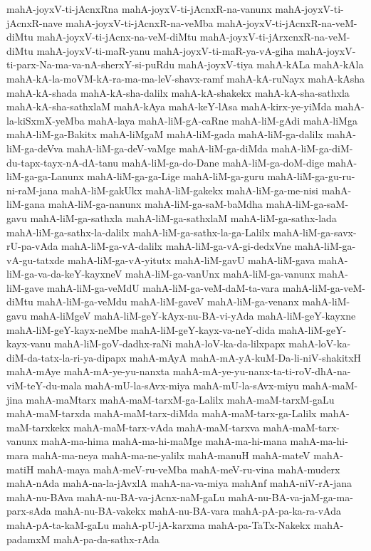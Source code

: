 {mahA-joyxV-ti-jAcnxRna
mahA-joyxV-ti-jAcnxR-na-vanunx
mahA-joyxV-ti-jAcnxR-nave
mahA-joyxV-ti-jAcnxR-na-veMba
mahA-joyxV-ti-jAcnxR-na-veM-diMtu
mahA-joyxV-ti-jAcnx-na-veM-diMtu
mahA-joyxV-ti-jArxcnxR-na-veM-diMtu
mahA-joyxV-ti-maR-yanu
mahA-joyxV-ti-maR-ya-vA-giha
mahA-joyxV-ti-parx-Na-ma-va-nA-sherxY-si-puRdu
mahA-joyxV-tiya
mahA-kALa
mahA-kAla
mahA-kA-la-moVM-kA-ra-ma-ma-leV-shavx-ramf
mahA-kA-ruNayx
mahA-kAsha
mahA-kA-shada
mahA-kA-sha-dalilx
mahA-kA-shakekx
mahA-kA-sha-sathxla
mahA-kA-sha-sathxlaM
mahA-kAya
mahA-keY-lAsa
mahA-kirx-ye-yiMda
mahA-la-kiSxmX-yeMba
mahA-laya
mahA-liM-gA-caRne
mahA-liM-gAdi
mahA-liMga
mahA-liM-ga-Bakitx
mahA-liMgaM
mahA-liM-gada
mahA-liM-ga-dalilx
mahA-liM-ga-deVva
mahA-liM-ga-deV-vaMge
mahA-liM-ga-diMda
mahA-liM-ga-diM-du-tapx-tayx-nA-dA-tanu
mahA-liM-ga-do-Dane
mahA-liM-ga-doM-dige
mahA-liM-ga-ga-Lanunx
mahA-liM-ga-ga-Lige
mahA-liM-ga-guru
mahA-liM-ga-gu-ru-ni-raM-jana
mahA-liM-gakUkx
mahA-liM-gakekx
mahA-liM-ga-me-nisi
mahA-liM-gana
mahA-liM-ga-nanunx
mahA-liM-ga-saM-baMdha
mahA-liM-ga-saM-gavu
mahA-liM-ga-sathxla
mahA-liM-ga-sathxlaM
mahA-liM-ga-sathx-lada
mahA-liM-ga-sathx-la-dalilx
mahA-liM-ga-sathx-la-ga-Lalilx
mahA-liM-ga-savx-rU-pa-vAda
mahA-liM-ga-vA-dalilx
mahA-liM-ga-vA-gi-dedxVne
mahA-liM-ga-vA-gu-tatxde
mahA-liM-ga-vA-yitutx
mahA-liM-gavU
mahA-liM-gava
mahA-liM-ga-va-da-keY-kayxneV
mahA-liM-ga-vanUnx
mahA-liM-ga-vanunx
mahA-liM-gave
mahA-liM-ga-veMdU
mahA-liM-ga-veM-daM-ta-vara
mahA-liM-ga-veM-diMtu
mahA-liM-ga-veMdu
mahA-liM-gaveV
mahA-liM-ga-venanx
mahA-liM-gavu
mahA-liMgeV
mahA-liM-geY-kAyx-nu-BA-vi-yAda
mahA-liM-geY-kayxne
mahA-liM-geY-kayx-neMbe
mahA-liM-geY-kayx-va-neY-dida
mahA-liM-geY-kayx-vanu
mahA-liM-goV-dadhx-raNi
mahA-loV-ka-da-lilxpapx
mahA-loV-ka-diM-da-tatx-la-ri-ya-dipapx
mahA-mAyA
mahA-mA-yA-kuM-Da-li-niV-shakitxH
mahA-mAye
mahA-mA-ye-yu-nanxta
mahA-mA-ye-yu-nanx-ta-ti-roV-dhA-na-viM-teY-du-mala
mahA-mU-la-sAvx-miya
mahA-mU-la-sAvx-miyu
mahA-maM-jina
mahA-maMtarx
mahA-maM-tarxM-ga-Lalilx
mahA-maM-tarxM-gaLu
mahA-maM-tarxda
mahA-maM-tarx-diMda
mahA-maM-tarx-ga-Lalilx
mahA-maM-tarxkekx
mahA-maM-tarx-vAda
mahA-maM-tarxva
mahA-maM-tarx-vanunx
mahA-ma-hima
mahA-ma-hi-maMge
mahA-ma-hi-mana
mahA-ma-hi-mara
mahA-ma-neya
mahA-ma-ne-yalilx
mahA-manuH
mahA-mateV
mahA-matiH
mahA-maya
mahA-meV-ru-veMba
mahA-meV-ru-vina
mahA-muderx
mahA-nAda
mahA-na-la-jAvxlA
mahA-na-va-miya
mahAnf
mahA-niV-rA-jana
mahA-nu-BAva
mahA-nu-BA-va-jAcnx-naM-gaLu
mahA-nu-BA-va-jaM-ga-ma-parx-sAda
mahA-nu-BA-vakekx
mahA-nu-BA-vara
mahA-pA-pa-ka-ra-vAda
mahA-pA-ta-kaM-gaLu
mahA-pU-jA-karxma
mahA-pa-TaTx-Nakekx
mahA-padamxM
mahA-pa-da-sathx-rAda
}
